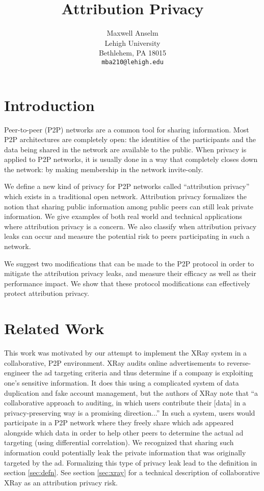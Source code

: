 \documentclass{article}
\title{Attribution Privacy}
\author{
Maxwell Anselm\\
Lehigh University\\
Bethlehem, PA 18015\\
\texttt{mba210@lehigh.edu}\\
}
\newcommand{\secref}[1]{section \ref{sec:#1}}
\begin{document}
\maketitle

\section{Introduction}

Peer-to-peer (P2P) networks are a common tool for sharing information. Most P2P
architectures are completely open: the identities of the participants and the
data being shared in the network are available to the public. When privacy is
applied to P2P networks, it is usually done in a way that completely closes down
the network: by making membership in the network invite-only\cite{privatep2p}.

We define a new kind of privacy for P2P networks called ``attribution privacy''
which exists in a traditional open network. Attribution privacy formalizes
the notion that sharing public information among public peers can still leak
private information. We give examples of both real world and technical
applications where attribution privacy is a concern. We also classify when
attribution privacy leaks can occur and measure the potential risk to peers
participating in such a network.

We suggest two modifications that can be made to the P2P protocol in order
to mitigate the attribution privacy leaks, and measure their efficacy as well as
their performance impact. We show that these protocol modifications can effectively
protect attribution privacy.

\section{Related Work}\label{sec:relwork}

This work was motivated by our attempt to implement the XRay
system\cite{xray} in a collaborative, P2P environment. XRay audits online
advertisements to reverse-engineer the ad targeting criteria and thus determine
if a company is exploiting one's sensitive information. It does this using a
complicated system of data duplication and fake account management, but the
authors of XRay note that ``a collaborative approach to auditing, in which users
contribute their [data] in a privacy-preserving way is a promising
direction...'' In such a system, users would participate in a P2P network where
they freely share which ads appeared alongside which data in order to help other
peers to determine the actual ad targeting (using differential correlation).
We recognized that sharing such information could potentially leak the private
information that was originally targeted by the ad. Formalizing this type of
privacy leak lead to the definition in \secref{defn}. See \secref{xray} for a
technical description of collaborative XRay as an attribution privacy risk.
\end{document}
